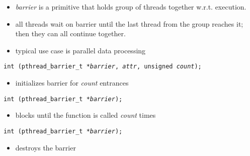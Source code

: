 \begin{slide}
\begin{itemize}
\item \emph{barrier} is a primitive that holds group of threads together
w.r.t. execution.
\item all threads wait on barrier until the last thread from the group
reaches it; then they can all continue together.
\item typical use case is parallel data processing
\end{itemize}
\texttt{int (pthread\_barrier\_t *\emph{barrier},
\emph{attr}, unsigned \emph{count});}
\begin{itemize}
\item initializes barrier for \emph{count} entrances
\end{itemize}
\texttt{int (pthread\_barrier\_t *\emph{barrier});}
\begin{itemize}
\item blocks until the function is called \emph{count} times
\end{itemize}
\texttt{int (pthread\_barrier\_t *\emph{barrier});}
\begin{itemize}
\item destroys the barrier
\end{itemize}
\end{slide}

\label{BARRIER}

